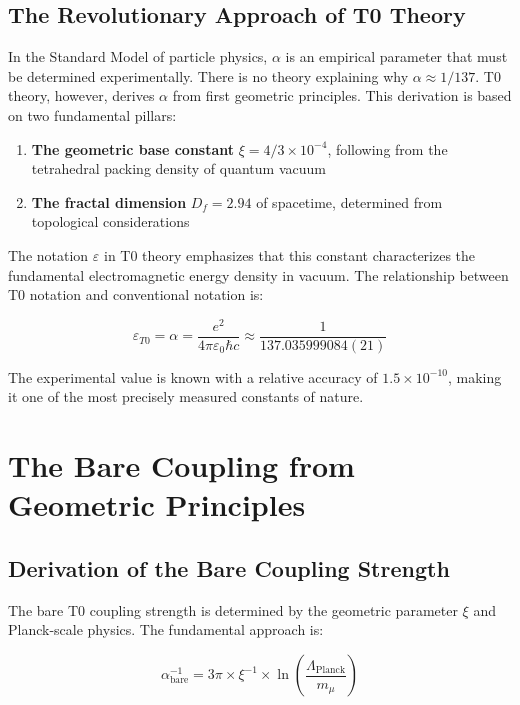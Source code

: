 \documentclass[12pt,a4paper]{article}
\theoremstyle{definition}
\begin{document}
	\subsection{The Revolutionary Approach of T0 Theory}
	
	In the Standard Model of particle physics, $\alpha$ is an empirical parameter that must be determined experimentally. There is no theory explaining why $\alpha \approx 1/137$. T0 theory, however, derives $\alpha$ from first geometric principles. This derivation is based on two fundamental pillars:
	
	\begin{enumerate}
		\item \textbf{The geometric base constant} $\xi = 4/3 \times 10^{-4}$, following from the tetrahedral packing density of quantum vacuum
		\item \textbf{The fractal dimension} $D_f = 2.94$ of spacetime, determined from topological considerations
	\end{enumerate}
	
	The notation $\varepsilon$ in T0 theory emphasizes that this constant characterizes the fundamental electromagnetic energy density in vacuum. The relationship between T0 notation and conventional notation is:
	
	\begin{equation}
		\varepsilon_{T0} = \alpha = \frac{e^2}{4\pi\varepsilon_0\hbar c} \approx \frac{1}{137.035999084(21)}
	\end{equation}
	
	The experimental value is known with a relative accuracy of $1.5 \times 10^{-10}$, making it one of the most precisely measured constants of nature.
	
	\section{The Bare Coupling from Geometric Principles}
	
	\subsection{Derivation of the Bare Coupling Strength}
	
	The bare T0 coupling strength is determined by the geometric parameter $\xi$ and Planck-scale physics. The fundamental approach is:
	
	\begin{equation}
		\alpha_{\text{bare}}^{-1} = 3\pi \times \xi^{-1} \times \ln\left(\frac{\Lambda_{\text{Planck}}}{m_{\mu}}\right)
	\end{equation}
	
\end{document}
